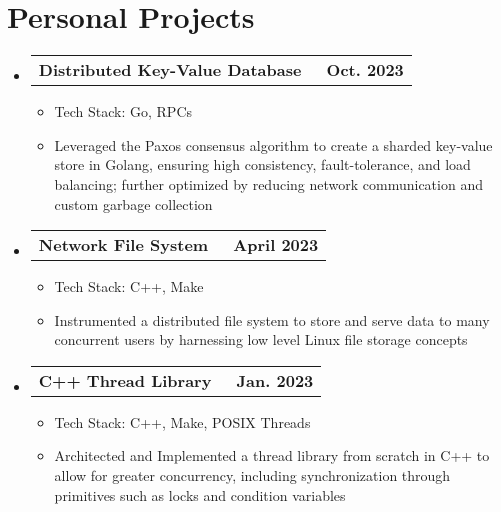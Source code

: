 \documentclass[letterpaper,11pt]{article}
\makeatletter
\newcommand{\resumeItem}[1]{
  \item\small{
    {#1 \vspace{-3pt}}
  }
}
\newcommand{\resumeProjectHeading}[2]{
  \vspace{-3pt}\item
    \begin{tabular*}{1.0\textwidth}[t]{l@{\extracolsep{\fill}}r}
      \textbf{#1} & \textbf{\small #2} \\
    \end{tabular*}\vspace{-7pt}
}
\newcommand{\resumeSubHeadingListStart}{\begin{itemize}[leftmargin=0.0in, label={}]}
\newcommand{\resumeSubHeadingListEnd}{\end{itemize}}
\newcommand{\resumeItemListStart}{\begin{itemize}}
\newcommand{\resumeItemListEnd}{\end{itemize}\vspace{0pt}}
\makeatother
\begin{document}
\section{Personal Projects}
\resumeSubHeadingListStart

\resumeProjectHeading
{Distributed Key-Value Database{\raisebox{-0.2\height}\ }}
{Oct. 2023}
\resumeItemListStart
\resumeItem{Tech Stack: Go, RPCs}
\resumeItem{Leveraged the Paxos consensus algorithm to create a sharded key-value store in Golang, ensuring high consistency, fault-tolerance, and load balancing; further optimized by reducing network communication and custom garbage collection}
\resumeItemListEnd

\resumeProjectHeading
{Network File System{\raisebox{-0.2\height}\ }}
{April 2023}
\resumeItemListStart
\resumeItem{Tech Stack: C++, Make}
\resumeItem{Instrumented a distributed file system to store and serve data to many concurrent users by harnessing low level Linux file storage concepts}
\resumeItemListEnd

\resumeProjectHeading
{C++ Thread Library{\raisebox{-0.2\height}\ }}
{Jan. 2023}
\resumeItemListStart
\resumeItem{Tech Stack: C++, Make, POSIX Threads}
\resumeItem{Architected and Implemented a thread library from scratch in C++ to allow for greater concurrency, including synchronization through primitives such as locks and condition variables}
\resumeItemListEnd

\resumeSubHeadingListEnd
\end{document}
